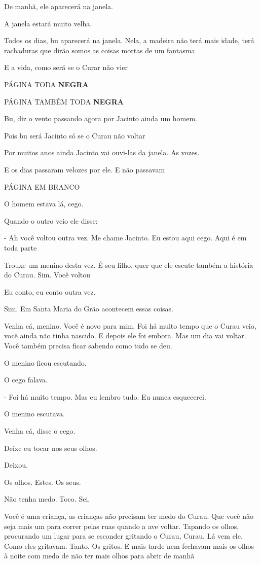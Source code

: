 De manhã, ele aparecerá na janela.

A janela estará muito velha.

Todos os dias, bu aparecerá na janela. Nela, a madeira não terá mais
idade, terá rachaduras que dirão somos as coisas mortas de um fantasma

E a vida, como será se o Curar não vier

PÁGINA TODA \textbf{NEGRA}

PÁGINA TAMBÉM TODA \textbf{NEGRA}

Bu, diz o vento passando agora por Jacinto ainda um homem.

Pois bu será Jacinto só se o Curau não voltar

Por muitos anos ainda Jacinto vai ouvi-las da janela. As vozes.

E os dias passaram velozes por ele. E não passavam

PÁGINA EM BRANCO

O homem estava lá, cego.

Quando o outro veio ele disse:

- Ah você voltou outra vez. Me chame Jacinto. Eu estou aqui cego. Aqui é
em toda parte

Trouxe um menino desta vez. É seu filho, quer que ele escute também a
história do Curau. Sim. Você voltou

Eu conto, eu conto outra vez.

Sim. Em Santa Maria do Grão acontecem essas coisas.

Venha cá, menino. Você é novo para mim. Foi há muito tempo que o Curau
veio, você ainda não tinha nascido. E depois ele foi embora. Mas um dia
vai voltar. Você também precisa ficar sabendo como tudo se deu.

O menino ficou escutando.

O cego falava.

- Foi há muito tempo. Mas eu lembro tudo. Eu nunca esquecerei.

O menino escutava.

Venha cá, disse o cego.

Deixe eu tocar nos seus olhos.

Deixou.

Os olhos. Estes. Os seus.

Não tenha medo. Toco. Sei.

Você é uma criança, as crianças não precisam ter medo do Curau. Que você
não seja mais um para correr pelas ruas quando a ave voltar. Tapando os
olhos, procurando um lugar para se esconder gritando o Curau, Curau. Lá
vem ele. Como eles gritavam. Tanto. Os gritos. E mais tarde nem fechavam
mais os olhos à noite com medo de não ter mais olhos para abrir de manhã

